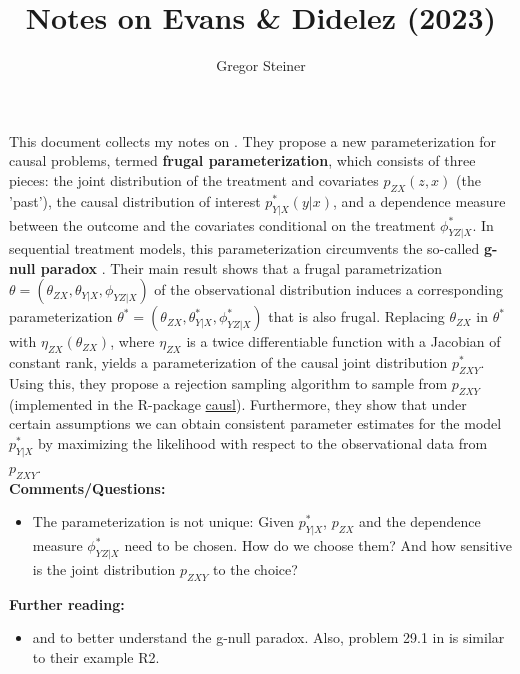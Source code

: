 \documentclass[10pt]{article}
\author{Gregor Steiner}
\title{Notes on Evans \& Didelez (2023)}
\begin{document}
\maketitle

This document collects my notes on \cite{evans_didelez_2023}. They propose a new parameterization for causal problems, termed \textbf{frugal parameterization}, which consists of three pieces: the joint distribution of the treatment and covariates $p_{ZX}(z, x)$ (the 'past'), the causal distribution of interest $p_{Y | X}^* (y|x)$, and a dependence measure between the outcome and the covariates conditional on the treatment $\phi_{YZ | X}^*$. In sequential treatment models, this parameterization circumvents the so-called \textbf{g-null paradox} \citep{robins_wasserman_1997}. Their main result shows that a frugal parametrization $\theta = (\theta_{ZX}, \theta_{Y|X}, \phi_{YZ | X})$ of the observational distribution induces a corresponding parameterization  $\theta^* = (\theta_{ZX}, \theta_{Y|X}^*, \phi_{YZ | X}^*)$ that is also frugal. Replacing $\theta_{ZX}$ in $\theta^*$ with $\eta_{ZX}(\theta_{ZX})$, where $\eta_{ZX}$ is a twice differentiable function with a Jacobian of constant rank, yields a parameterization of the causal joint distribution $p_{ZXY}^*$. Using this, they propose a rejection sampling algorithm to sample from $p_{ZXY}$ (implemented in the R-package \href{https://github.com/rje42/causl}{causl}). Furthermore, they show that under certain assumptions we can obtain consistent parameter estimates for the model $p_{Y | X}^*$ by maximizing the likelihood with respect to the observational data from $p_{ZXY}$. \\

\textbf{Comments/Questions:}
\begin{itemize}
	\item The parameterization is not unique: Given $p_{Y|X}^*$, $p_{ZX}$ and the dependence measure $ \phi_{YZ | X}^*$ need to be chosen. How do we choose them? And how sensitive is the joint distribution $p_{ZXY}$ to the choice?
\end{itemize}

\textbf{Further reading:} 
\begin{itemize}
	\item \cite{robins_wasserman_1997} and \cite{mcgrath2022revisiting} to better understand the g-null paradox. Also, problem 29.1 in \cite{ding2023course} is similar to their example R2.
\end{itemize}










\end{document}
